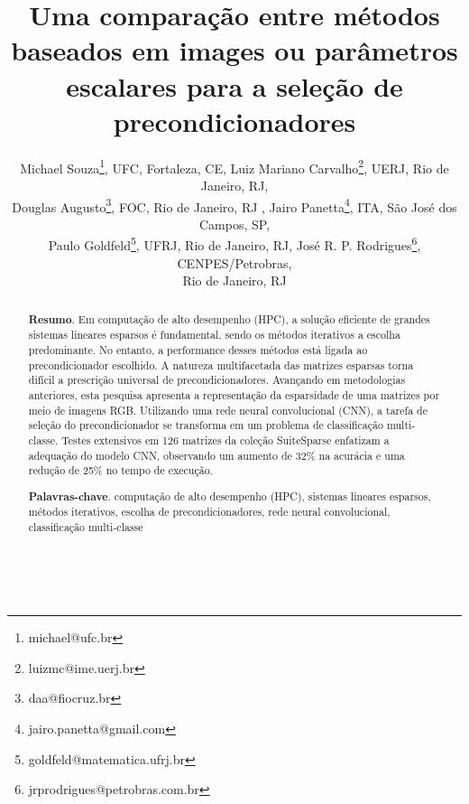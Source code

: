 \documentclass{pssbmac}
\begin{document}
{}{\

\title{Uma comparação entre métodos baseados em images ou parâmetros escalares para a seleção de precondicionadores}

\author{
    {\large Michael Souza}\thanks{michael@ufc.br}, {\small UFC, Fortaleza, CE},  {\large Luiz Mariano Carvalho}\thanks{luizmc@ime.uerj.br}, {\small  UERJ, Rio de Janeiro, RJ}, \\
    {\large Douglas Augusto}\thanks{daa@fiocruz.br}, {\small FOC, Rio de Janeiro, RJ }, {\large Jairo Panetta}\thanks{jairo.panetta@gmail.com}, {\small ITA, São José dos Campos, SP}, \\
    {\large Paulo Goldfeld}\thanks{goldfeld@matematica.ufrj.br}, {\small UFRJ, Rio de Janeiro, RJ}, {\large José R. P. Rodrigues}\thanks{jrprodrigues@petrobras.com.br}, {\small CENPES/Petrobras}, \\ {\small Rio de Janeiro, RJ} \\
}
}
\criartitulo



\begin{abstract}
{\bf Resumo}. Em computação de alto desempenho (HPC), a solução eficiente de grandes sistemas lineares esparsos é fundamental, 
sendo os métodos iterativos a escolha predominante. No entanto, a performance desses métodos está ligada ao precondicionador
 escolhido. A natureza multifacetada das matrizes esparsas
torna difícil a prescrição universal de precondicionadores. Avançando em metodologias anteriores, esta pesquisa apresenta a representação da esparsidade de uma matrizes
 por meio de imagens RGB. Utilizando uma rede neural convolucional
(CNN), a tarefa de seleção do precondicionador se transforma em um problema de classificação
multi-classe. Testes extensivos em 126 matrizes da coleção SuiteSparse enfatizam a
adequação do modelo CNN, observando um aumento de 32\% na acurácia e uma redução de 25\%
no tempo de execução.

\noindent
{\bf Palavras-chave}. computação de alto desempenho (HPC), sistemas lineares esparsos,  métodos iterativos, escolha de precondicionadores,
 rede neural convolucional, classificação multi-classe
\end{abstract}
\end{document}
